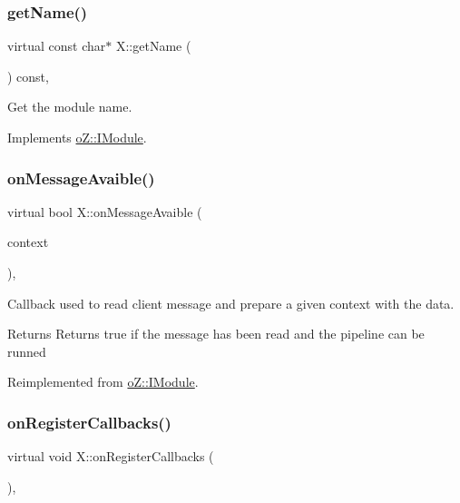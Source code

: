 \subsubsection{\texorpdfstring{getName()}{getName()}}
{\footnotesize\ttfamily virtual const char$\ast$ X\+::get\+Name (\begin{DoxyParamCaption}\item[{void}]{ }\end{DoxyParamCaption}) const\hspace{0.3cm}{\ttfamily [inline]}, {\ttfamily [virtual]}}



Get the module name. 



Implements \mbox{\hyperlink{classo_z_1_1_i_module_af41d45158fd28e1bd86a34e25f5282d6}{o\+Z\+::\+I\+Module}}.

\mbox{\label{class_x_a5ca389f4b8f8ffb518cc37336f212118}} 
\subsubsection{\texorpdfstring{onMessageAvaible()}{onMessageAvaible()}}
{\footnotesize\ttfamily virtual bool X\+::on\+Message\+Avaible (\begin{DoxyParamCaption}\item[{\mbox{\hyperlink{classo_z_1_1_context}{o\+Z\+::\+Context}} \&}]{context }\end{DoxyParamCaption})\hspace{0.3cm}{\ttfamily [inline]}, {\ttfamily [virtual]}}



Callback used to read client message and prepare a given context with the data. 

\begin{DoxyReturn}{Returns}
Returns true if the message has been read and the pipeline can be runned 
\end{DoxyReturn}


Reimplemented from \mbox{\hyperlink{classo_z_1_1_i_module_ae7f25d557f48e4117979818ec89b9e12}{o\+Z\+::\+I\+Module}}.

\mbox{\label{class_x_a15a956080c7158b8979f2a674ca28443}} 
\subsubsection{\texorpdfstring{onRegisterCallbacks()}{onRegisterCallbacks()}}
{\footnotesize\ttfamily virtual void X\+::on\+Register\+Callbacks (\begin{DoxyParamCaption}\item[{\mbox{\hyperlink{classo_z_1_1_pipeline}{Pipeline}} \&}]{ }\end{DoxyParamCaption})\hspace{0.3cm}{\ttfamily [inline]}, {\ttfamily [virtual]}}



